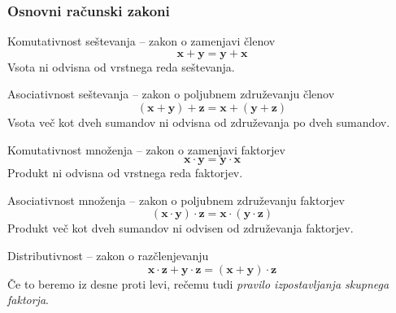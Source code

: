         \begin{frame}
            \frametitle{Osnovni računski zakoni}

            \begin{block}{Komutativnost seštevanja -- zakon o zamenjavi členov}
                $$ \mathbf{x+y=y+x}$$
                Vsota ni odvisna od vrstnega reda seštevanja.
            \end{block}

            \begin{block}{Asociativnost seštevanja -- zakon o poljubnem združevanju členov}
                $$ \mathbf{(x+y)+z=x+(y+z)}$$
                Vsota več kot dveh sumandov ni odvisna od združevanja po dveh sumandov.
            \end{block}

        \end{frame}

        \begin{frame}


            \begin{block}{Komutativnost množenja -- zakon o zamenjavi faktorjev}
                $$ \mathbf{x\cdot y=y\cdot x}$$
                Produkt ni odvisna od vrstnega reda faktorjev.
            \end{block}

            \begin{block}{Asociativnost množenja -- zakon o poljubnem združevanju faktorjev}
                $$ \mathbf{(x\cdot y)\cdot z=x\cdot (y\cdot z)}$$
                Produkt več kot dveh sumandov ni odvisen od združevanja faktorjev.
            \end{block}
            \begin{block}{Distributivnost -- zakon o razčlenjevanju}
                $$ \mathbf{x\cdot z+y\cdot z = (x+y)\cdot z} $$
                Če to beremo iz desne proti levi, rečemu tudi \textit{pravilo izpostavljanja skupnega faktorja}.
            \end{block}

        \end{frame}

